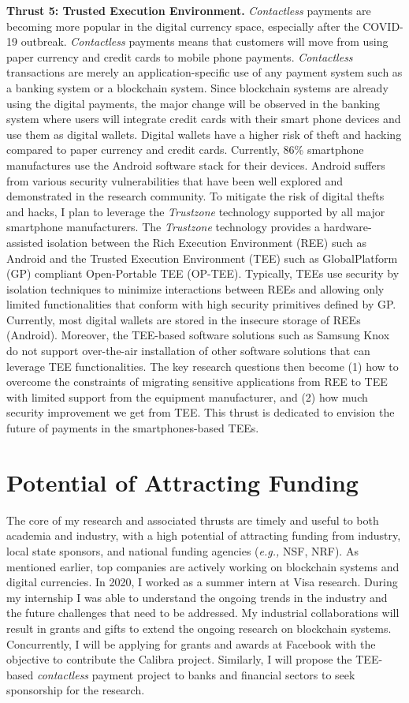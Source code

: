\documentclass{NSF}
\newcommand{\BfPara}[1]{{\noindent\textbf{#1.}}\xspace}
\newcommand{\eg}{{\em e.g.,}\xspace}
\begin{document}
\BfPara{Thrust 5: Trusted Execution Environment} {\em Contactless} payments are becoming more popular in the digital currency space, especially after the COVID-19 outbreak. {\em Contactless} payments means that customers will move from using paper currency and credit cards to mobile phone payments. {\em Contactless} transactions are merely an application-specific use of any payment system such as a banking system or a blockchain system. Since blockchain systems are already using the digital payments, the major change will be observed in the banking system where users will integrate credit cards with their smart phone devices and use them as digital wallets. Digital wallets have a higher risk of theft and hacking compared to paper currency and credit cards. Currently, 86\% smartphone manufactures use the Android software stack for their devices. Android suffers from various security vulnerabilities that have been well explored and demonstrated in the research community. To mitigate the risk of digital thefts and hacks, I plan to leverage the {\em Trustzone} technology supported by all major smartphone manufacturers. The {\em Trustzone} technology provides a hardware-assisted isolation between the Rich Execution Environment (REE) such as Android and the Trusted Execution Environment (TEE) such as GlobalPlatform (GP) compliant Open-Portable TEE (OP-TEE). Typically, TEEs use security by isolation techniques to minimize interactions between REEs and allowing only limited functionalities that conform with high security primitives defined by GP. Currently, most digital wallets are stored in the insecure storage of REEs (Android). Moreover, the TEE-based software solutions such as Samsung Knox do not support over-the-air installation of other software solutions that can leverage TEE functionalities. The key research questions then become (1) how to overcome the constraints of migrating sensitive applications from REE to TEE with limited support from the equipment manufacturer, and (2) how much security improvement we get from TEE. This thrust is dedicated to envision the future of payments in the smartphones-based TEEs. 


\section{Potential of Attracting Funding}\vspace{-1mm}
The core of my research and associated thrusts are timely and useful to both academia and industry, with a high potential of attracting funding from industry, local state sponsors, and national funding agencies (\eg NSF, NRF). As mentioned earlier, top companies are actively working on blockchain systems and digital currencies. In 2020, I worked as a summer intern at Visa research. During my internship I was able to understand the ongoing trends in the industry and the future challenges that need to be addressed. My industrial collaborations will result in grants and gifts to extend the ongoing research on blockchain systems. Concurrently, I will be applying for grants and awards at Facebook with the objective to contribute the Calibra project. Similarly, I will propose the TEE-based {\em contactless} payment project to banks and financial sectors to seek sponsorship for the research. 
\end{document}
